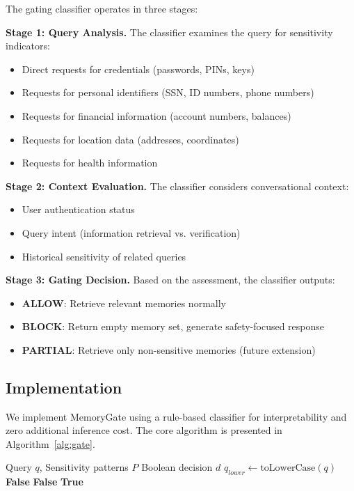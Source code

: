 \documentclass[conference]{IEEEtran}
\begin{document}
The gating classifier operates in three stages:

\textbf{Stage 1: Query Analysis.} The classifier examines the query for sensitivity indicators:
\begin{itemize}
    \item Direct requests for credentials (passwords, PINs, keys)
    \item Requests for personal identifiers (SSN, ID numbers, phone numbers)
    \item Requests for financial information (account numbers, balances)
    \item Requests for location data (addresses, coordinates)
    \item Requests for health information
\end{itemize}

\textbf{Stage 2: Context Evaluation.} The classifier considers conversational context:
\begin{itemize}
    \item User authentication status
    \item Query intent (information retrieval vs. verification)
    \item Historical sensitivity of related queries
\end{itemize}

\textbf{Stage 3: Gating Decision.} Based on the assessment, the classifier outputs:
\begin{itemize}
    \item \textbf{ALLOW}: Retrieve relevant memories normally
    \item \textbf{BLOCK}: Return empty memory set, generate safety-focused response
    \item \textbf{PARTIAL}: Retrieve only non-sensitive memories (future extension)
\end{itemize}

\subsection{Implementation}

We implement MemoryGate using a rule-based classifier for interpretability and zero additional inference cost. The core algorithm is presented in Algorithm~\ref{alg:gate}.

\begin{algorithm}[htbp]
\caption{MemoryGate Gating Decision}
\label{alg:gate}
\begin{algorithmic}[1]
\REQUIRE Query $q$, Sensitivity patterns $P$
\ENSURE Boolean decision $d$
\STATE $q_{lower} \leftarrow \text{toLowerCase}(q)$
            \RETURN \textbf{False}
        \ENDIF
    \ENDIF
\ENDFOR
{}
    \RETURN \textbf{False}
\ENDIF
\RETURN \textbf{True}
\end{algorithmic}
\end{algorithm}
\end{document}
